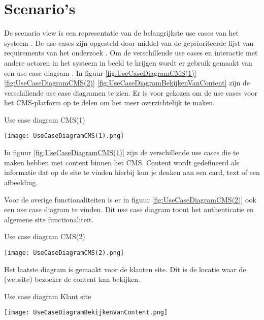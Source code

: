\section{Scenario's}
De scenario view is een representatie van de belangrijkste use cases van het systeem \parencite{4+1ViewModelPaper}.
De use cases zijn opgesteld door middel van de geprioriteerde lijst van requirements van het onderzoek \parencite{DanteOnderzoek}.
Om de verschillende use cases en interactie met andere actoren in het systeem in beeld te krijgen wordt er gebruik gemaakt van een use case diagram \parencite{UseCaseDiagram}.
In figuur \ref{fig:UseCaseDiagramCMS(1)} \ref{fig:UseCaseDiagramCMS(2)} \ref{fig:UseCaseDiagramBekijkenVanContent} zijn de verschillende use case diagramen te zien.
Er is voor gekozen om de use cases voor het CMS-platform op te delen om het meer overzichtelijk te maken.

\whitespace[2]
\begin{graphic}
	\captionsetup{type=figure}
	\caption{Use case diagram CMS(1)}
	\texttt{[image: UseCaseDiagramCMS(1).png]}
	\label{fig:UseCaseDiagramCMS(1)}
\end{graphic}

\whitespace[2]
In figuur \ref{fig:UseCaseDiagramCMS(1)} zijn de verschillende use cases die te maken hebben met content binnen het CMS.
Content wordt gedefineerd als informatie dat op de site te vinden hierbij kun je denken aan een card, text of een afbeelding.
 
\newpage

\whitespace
Voor de overige functionaliteiten is er in figuur \ref{fig:UseCaseDiagramCMS(2)} ook een use case diagram te vinden.
Dit use case diagram toont het authenticatie en algemene site functionaliteit.

\whitespace
\begin{graphic}
	\captionsetup{type=figure}
	\caption{Use case diagram CMS(2)}
	\texttt{[image: UseCaseDiagramCMS(2).png]}
	\label{fig:UseCaseDiagramCMS(2)}
\end{graphic}

\whitespace
Het laatste diagram is gemaakt voor de klanten site.
Dit is de locatie waar de (website) bezoeker de content kan bekijken.

\whitespace
\begin{graphic}
	\captionsetup{type=figure}
	\caption{Use case diagram Klant site}
	\texttt{[image: UseCaseDiagramBekijkenVanContent.png]}
	\label{fig:UseCaseDiagramBekijkenVanContent}
\end{graphic}
